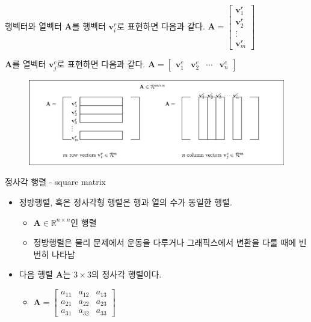 \documentclass{beamer}
\begin{document}
\begin{frame}{행벡터와 열벡터}
$\mathbf A$를 행벡터 $\mathbf v_i^r$로 표현하면 다음과 같다.
$\mathbf A = \left [ 
\begin{array}{c}
\mathbf v_1^r\\
\mathbf v_2^r\\
\vdots\\
\mathbf v_m^r
\end{array}
\right ]$

$\mathbf A$를 열벡터 $\mathbf v_j^c$로 표현하면 다음과 같다.
$\mathbf A = \left [ 
\begin{array}{cccc}
\mathbf v_1^c & \mathbf v_2^c & \cdots & \mathbf v_n^c
\end{array}
\right ]$

\begin{figure}
\includegraphics[width=12cm]{Math_matrix/matrixAsVectorCollection.eps}
\end{figure}

\end{frame}


\begin{frame}{정사각 행렬 - square matrix}

\begin{itemize}
\item 정방행렬, 혹은 정사각형 행렬은 행과 열의 수가 동일한 행렬.
	\begin{itemize}
	\item $\mathbf A \in \mathbb R^{n \times n}$인 행렬
	\item 정방행렬은 물리 문제에서 운동을 다루거나 그래픽스에서 변환을 다룰 때에 빈번히 나타남
	\end{itemize}
\item 다음 행렬 $\mathbf A$는 $3\times 3$의 정사각 행렬이다.
	\begin{itemize}
	\item $ \mathbf A = \left [ 
		\begin{array}{ccc}
		a_{11} & a_{12} & a_{13} \nonumber \\
		a_{21} & a_{22} & a_{23} \\
		a_{31} & a_{32} & a_{33} 
		\end{array}
		\right ] $
	\end{itemize}
\end{itemize}


\end{frame}
\end{document}
